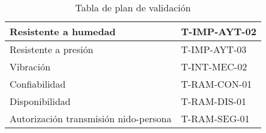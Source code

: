 \begin{table}[H]
\begin{tabular}{|l|l|}
Resistente a humedad                                                                                                 & T-IMP-AYT-02                              \\ \hline
Resistente a presión                                                                                                 & T-IMP-AYT-03                              \\ \hline
Vibración                                                                                                            & T-INT-MEC-02                              \\ \hline
Confiabilidad                                                                                                        & T-RAM-CON-01                              \\ \hline
Disponibilidad                                                                                                       & T-RAM-DIS-01                              \\ \hline
Autorización transmisión nido-persona                                                                                & T-RAM-SEG-01                              \\ \hline
\end{tabular}
\caption{Tabla de plan de validación}
\end{table}